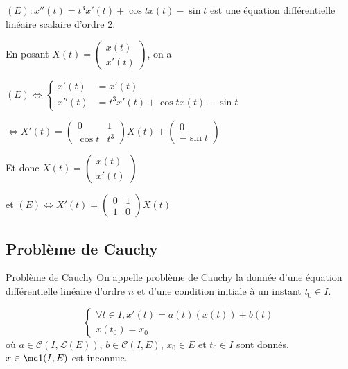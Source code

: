 \begin{exemple}
    $(E) : x''(t) = t^3 x'(t) + \cos t x(t) - \sin t$
    est une équation différentielle linéaire scalaire d'ordre 2. 

    En posant $X(t) = \begin{pmatrix}
        x(t) \\ x'(t)
     \end{pmatrix}$, on a 

     $(E) \Leftrightarrow \begin{cases}
        x'(t) & = x'(t) \\
        x''(t) & = t^3 x'(t) + \cos t x(t) - \sin t
     \end{cases}$

     $\Leftrightarrow X'(t) = \begin{pmatrix}
        0 & 1 \\
        \cos t & t^3
        \end{pmatrix} X(t) + \begin{pmatrix}
        0 \\ -\sin t
     \end{pmatrix}$

    Et donc $X(t) = \begin{pmatrix}
        x(t) \\ x'(t)
     \end{pmatrix}$ 

     et $(E) \Leftrightarrow X'(t) = \begin{pmatrix}
        0 & 1 \\
        1 & 0 \end{pmatrix} X(t) $
\end{exemple}

\subsection{Problème de Cauchy}

\begin{definition}{Problème de Cauchy}{}
    On appelle problème de Cauchy la donnée d'une équation différentielle linéaire d'ordre $n$ et 
    d'une condition initiale à un instant $t_0 \in I$. 
\end{definition}


\svspace $$\begin{cases}
    \forall t \in I, x'(t) = a(t)(x(t)) + b(t) \\
    x(t_0) = x_0
\end{cases}$$
où $a \in \mathscr C(I, \mathscr L(E))$, $b \in \mathscr C(I, E)$, $x_0 \in E$
et $t_0 \in I$ sont donnés. $x \in \mc 1 (I, E)$ est inconnue.

